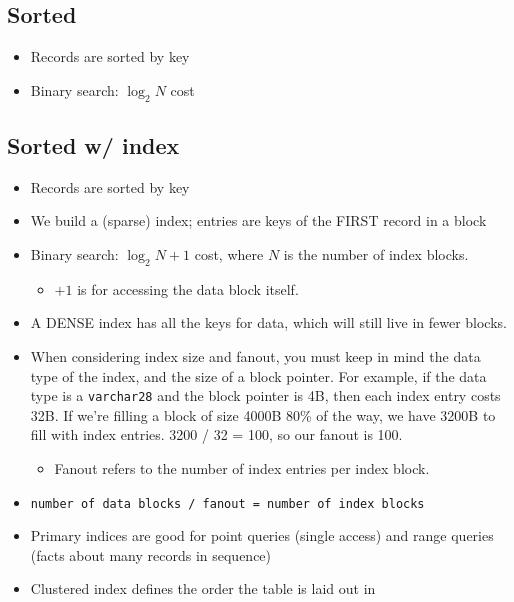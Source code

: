 \documentclass[11pt]{article}
\begin{document}
\subsection{Sorted}
\label{sec:org93a8244}
\begin{itemize}
\item Records are sorted by key
\item Binary search: \(\log_2{N}\) cost
\end{itemize}

\subsection{Sorted w/ index}
\label{sec:org94f446c}
\begin{itemize}
\item Records are sorted by key
\item We build a (sparse) index; entries are keys of the FIRST record in a block
\item Binary search: \(\log_2{N} + 1\) cost, where \(N\) is the number of index
blocks.
\begin{itemize}
\item \(+ 1\) is for accessing the data block itself.
\end{itemize}

\item A DENSE index has all the keys for data, which will still live in fewer blocks.

\item When considering index size and fanout, you must keep in mind the data type
of the index, and the size of a block pointer. For example, if the data
type is a \texttt{varchar28} and the block pointer is 4B, then each index entry
costs 32B. If we're filling a block of size 4000B 80\% of the way, we have
3200B to fill with index entries. 3200 / 32 = 100, so our fanout is 100.

\begin{itemize}
\item Fanout refers to the number of index entries per index block.
\end{itemize}

\item \texttt{number of data blocks / fanout = number of index blocks}

\item Primary indices are good for point queries (single access) and range queries
(facts about many records in sequence)

\item Clustered index defines the order the table is laid out in
\end{itemize}
\end{document}
